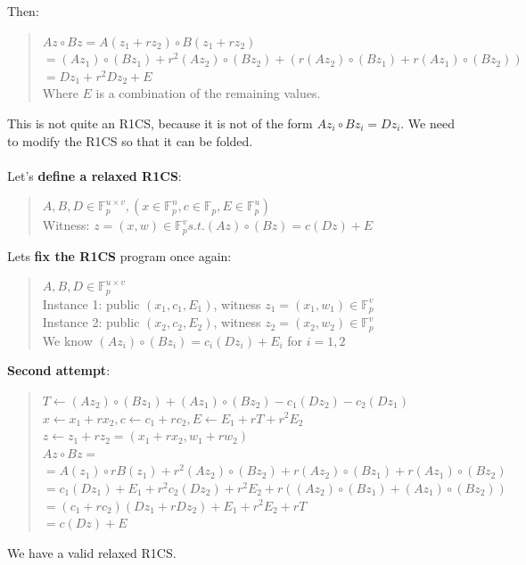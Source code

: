 Then:
\begin{quote}
   $Az \circ Bz = A(z_1 + r z_2) \circ B(z_1 + rz_2)$
   \\
   $= (Az_1) \circ (Bz_1) + r^2 (Az_2) \circ (Bz_2) + (r(Az_2) \circ (Bz_1) + r(Az_1) \circ (Bz_2))$
   \\
   $=Dz_1 + r^2Dz_2 + E$
   \\
   Where $E$ is a combination of the remaining values.
   \\
\end{quote}
This is not quite an R1CS, because it is not of the form $Az_i \circ Bz_i = Dz_i$.
We need to modify the R1CS so that it can be folded.
\\
\\
Let's \textbf{define a relaxed R1CS}:
\begin{quote}
$A, B,D \in \mathbb{F}^{u \times v}_p, (x \in  \mathbb{F}^n_p, c \in \mathbb{F}_p, E \in \mathbb{F}^u_p) $
\\
Witness: $ z = (x,w) \in \mathbb{F}^v_p s.t. (Az) \circ (Bz) = c(Dz) + E$
\end{quote}
Lets \textbf{fix the R1CS} program once again:
\begin{quote}
$A,B,D \in \mathbb{F}^{u \times v}_p $
\\
Instance 1: public $ (x_1,c_1,E_1)$, witness $z_1 = (x_1, w_1) \in \mathbb{F}^v_p$
\\
Instance 2: public $(x_2,c_2,E_2)$, witness $ z_2 = (x_2, w_2) \in \mathbb{F}^v_p$
\\
We know $(Az_i) \circ (Bz_i) = c_i(Dz_i) + E_i$ for $ i = 1,2$
\end{quote}


\textbf{Second attempt}:
\begin{quote}
$T \leftarrow (Az_2) \circ (Bz_1) + (Az_1) \circ (Bz_2) - c_1(Dz_2) - c_2(Dz_1)$
\\
$x \leftarrow x_1 + rx_2, c \leftarrow c_1 + rc_2, E \leftarrow E_1 + rT +r^2E_2$
\\
$z \leftarrow z_1 + rz_2 = (x_1 +rx_2, w_1 + rw_2)$
\\
$Az \circ Bz = $
\\
$=A(z_1) \circ rB(z_1) +r^2(Az_2) \circ (Bz_2) + r(Az_2) \circ (Bz_1) + r(Az_1) \circ (Bz_2)$
\\
$=c_1(Dz_1) + E_1 + r^2c_2(Dz_2) + r^2E_2+r((Az_2) \circ (Bz_1) + (Az_1) \circ (Bz_2))$
\\
$=(c_1+rc_2)(Dz_1+rDz_2)+E_1+r^2E_2+rT$
\\
$=c(Dz) + E$
\end{quote}
We have a valid relaxed R1CS.\cite{ZKM10} \cite{FG23}

